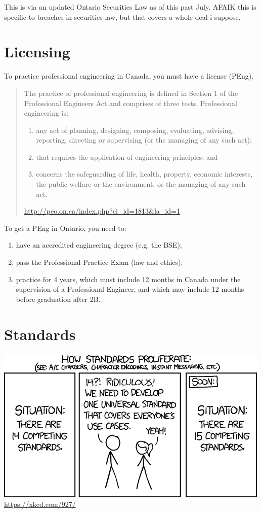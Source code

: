 \documentclass[11pt]{article}
\begin{document}
This is via an updated Ontario Securities Law as of this past July. AFAIK this is specific to breaches in securities law, but that covers a whole deal i suppose.
\newpage
\section*{Licensing}
To practice professional engineering in Canada, you must have a license (PEng).

\begin{quote}
The practice of professional engineering is defined in Section 1 of the Professional Engineers Act and comprises of three tests. Professional engineering is:

\begin{enumerate}
\item    any act of planning, designing, composing, evaluating, advising, reporting, directing or supervising (or the managing of any such act);
\item    that requires the application of engineering principles; and
\item    concerns the safeguarding of life, health, property, economic interests, the public welfare or the environment, or the managing of any such act.
\end{enumerate}

\hfill \url{http://peo.on.ca/index.php?ci_id=1813&la_id=1}
\end{quote}

To get a PEng in Ontario, you need to:
\begin{enumerate}
\item have an accredited engineering degree (e.g. the BSE);
\item pass the Professional Practice Exam (law and ethics);
\item practice for 4 years, which must include 12 months in Canada under the supervision of a Professional Engineer, and which may include 12 months before graduation after 2B.
\end{enumerate}

\section*{Standards}

\begin{center}
\includegraphics[width=.7\textwidth]{images/standards.png}\\
\url{https://xkcd.com/927/}
\end{center}
\end{document}
